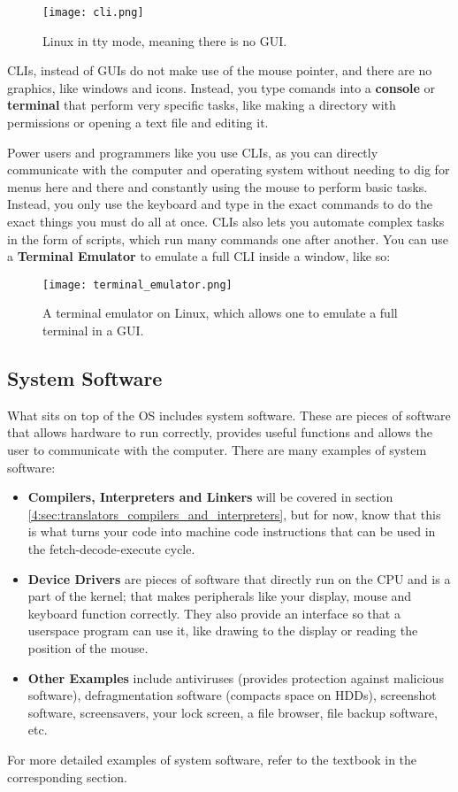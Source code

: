 \documentclass[../main.tex]{subfiles}
\begin{document}
\begin{figure}[H]
    \centering
    \texttt{[image: cli.png]}
    \caption{Linux in tty mode, meaning there is no GUI.}
    \label{fig:cli}
\end{figure}

CLIs, instead of GUIs do not make use of the mouse pointer, and there are no graphics, like windows and icons. Instead, you type comands into a \textbf{console} or \textbf{terminal} that perform very specific tasks, like making a directory with permissions or opening a text file and editing it.

Power users and programmers like you use CLIs, as you can directly communicate with the computer and operating system without needing to dig for menus here and there and constantly using the mouse to perform basic tasks. Instead, you only use the keyboard and type in the exact commands to do the exact things you must do all at once. CLIs also lets you automate complex tasks in the form of scripts, which run many commands one after another. You can use a \textbf{Terminal Emulator} to emulate a full CLI inside a window, like so:

\begin{figure}[H]
    \centering
    \texttt{[image: terminal\_emulator.png]}
    \caption{A terminal emulator on Linux, which allows one to emulate a full terminal in a GUI.}
    \label{fig:terminal_emulator}
\end{figure}

\subsection{System Software}

What sits on top of the OS includes system software. These are pieces of software that allows hardware to run correctly, provides useful functions and allows the user to communicate with the computer. There are many examples of system software:

\begin{itemize}
    \item \textbf{Compilers, Interpreters and Linkers} will be covered in section \ref{4:sec:translators_compilers_and_interpreters}, but for now, know that this is what turns your code into machine code instructions that can be used in the fetch-decode-execute cycle.
    \item \textbf{Device Drivers} are pieces of software that directly run on the CPU and is a part of the kernel; that makes peripherals like your display, mouse and keyboard function correctly. They also provide an interface so that a userspace program can use it, like drawing to the display or reading the position of the mouse.
    \item \textbf{Other Examples} include antiviruses (provides protection against malicious software), defragmentation software (compacts space on HDDs), screenshot software, screensavers, your lock screen, a file browser, file backup software, etc.
\end{itemize}

For more detailed examples of system software, refer to the textbook in the corresponding section.
\end{document}
